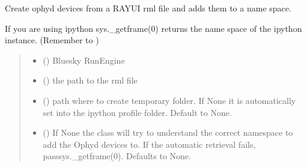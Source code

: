 \documentclass[letterpaper,10pt,english]{sphinxmanual}
\begin{document}
\begin{fulllineitems}
\label{\detokenize{API:raypyng_bluesky.RaypyngOphydDevices.RaypyngOphydDevices}}
\pysigstartsignatures
{}
\pysigstopsignatures
\sphinxAtStartPar
Create ophyd devices from a RAY\sphinxhyphen{}UI rml file and adds them to a name space.

\sphinxAtStartPar
If you are using ipython sys.\_getframe(0) returns the name space of the ipython instance.
(Remember to )
\begin{quote}\begin{description}
\begin{itemize}
\item {} 
\sphinxAtStartPar
{} () \textendash{} Bluesky RunEngine

\item {} 
\sphinxAtStartPar
{} () \textendash{} the path to the rml file

\item {} 
\sphinxAtStartPar
{} () \textendash{} path where to create temporary folder. If None it is automatically
set into the ipython profile folder. Default to None.

\item {} 
\sphinxAtStartPar
{} (\sphinxstyleliteralemphasis{\sphinxupquote{, }}) \textendash{} If None the class will try to understand the correct namespace to add the Ophyd devices to.
If the automatic retrieval fails, pass\textasciigrave{}\textasciigrave{}sys.\_getframe(0)\textasciigrave{}\textasciigrave{}. Defaults to None.


\end{itemize}
\end{description}
\end{quote}
\end{fulllineitems}
\end{document}
